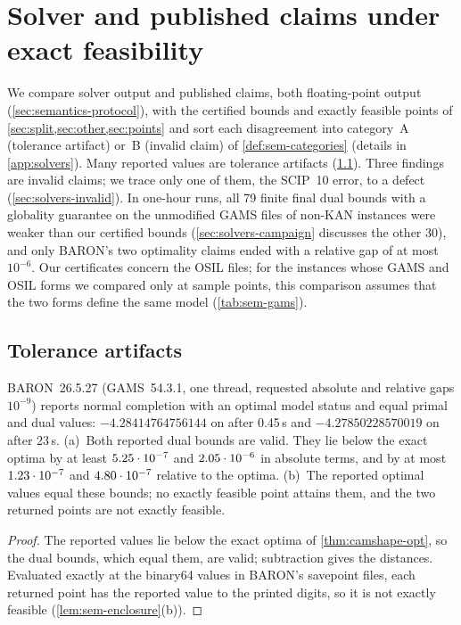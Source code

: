 \section{Solver and published claims under exact feasibility}\label{sec:solvers}

We compare solver output and published claims, both floating-point output (\cref{sec:semantics-protocol}), with the certified bounds and exactly feasible points of \cref{sec:split,sec:other,sec:points} and sort each disagreement into category~A (tolerance artifact) or~B (invalid claim) of \cref{def:sem-categories} (details in \cref{app:solvers}).
Many reported values are tolerance artifacts (\cref{sec:solvers-tolerance}).
Three findings are invalid claims; we trace only one of them, the SCIP~10 error, to a defect (\cref{sec:solvers-invalid}).
In one-hour runs, all 79 finite final dual bounds with a globality guarantee on the unmodified GAMS files of non-KAN instances were weaker than our certified bounds (\cref{sec:solvers-campaign} discusses the other 30), and only BARON's two optimality claims ended with a relative gap of at most $10^{-6}$.
Our certificates concern the OSIL files; for the instances whose GAMS and OSIL forms we compared only at sample points, this comparison assumes that the two forms define the same model (\cref{tab:sem-gams}).

\subsection{Tolerance artifacts}\label{sec:solvers-tolerance}

\begin{proposition}\label{prop:baron-camshape}
BARON~26.5.27 (GAMS~54.3.1, one thread, requested absolute and relative gaps $10^{-9}$) reports normal completion with an optimal model status and equal primal and dual values: $-4.28414764756144$ on  after 0.45\,s and $-4.27850228570019$ on  after 23\,s.
\textup{(a)}~Both reported dual bounds are valid.
They lie below the exact optima by at least $5.25\cdot 10^{-7}$ and $2.05\cdot 10^{-6}$ in absolute terms, and by at most $1.23\cdot 10^{-7}$ and $4.80\cdot 10^{-7}$ relative to the optima.
\textup{(b)}~The reported optimal values equal these bounds; no exactly feasible point attains them, and the two returned points are not exactly feasible.
\end{proposition}

\begin{proof}
The reported values lie below the exact optima of \cref{thm:camshape-opt}, so the dual bounds, which equal them, are valid; subtraction gives the distances.
Evaluated exactly at the binary64 values in BARON's savepoint files, each returned point has the reported value to the printed digits, so it is not exactly feasible (\cref{lem:sem-enclosure}(b)).
\end{proof}

